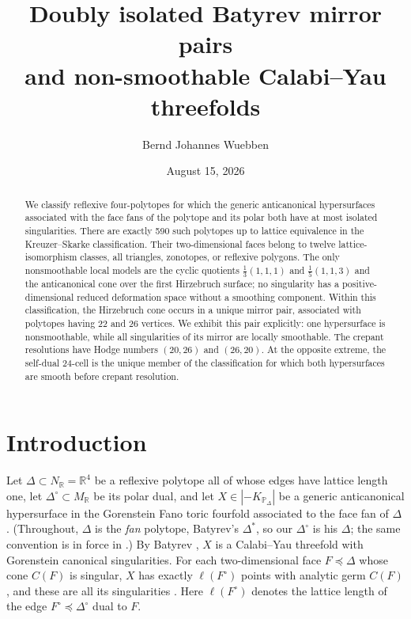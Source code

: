 \documentclass[11pt]{amsart}
\title[Doubly isolated Batyrev mirror pairs]{Doubly isolated Batyrev mirror
pairs\\ and non-smoothable Calabi--Yau threefolds}
\author{Bernd Johannes Wuebben}
\date{August 15, 2026}
\theoremstyle{definition}
\theoremstyle{remark}
\newcommand{\RR}{\mathbb{R}}
\newcommand{\PP}{\mathbb{P}}
\newcommand{\NN}{N}
\newcommand{\MM}{M}
\begin{document}
\begin{abstract}
We classify reflexive four-polytopes for which the generic
anticanonical hypersurfaces associated with the face fans of the polytope
and its polar both have at most isolated singularities. There are exactly
590 such polytopes up to lattice equivalence in the Kreuzer--Skarke
classification.
Their two-dimensional faces belong to twelve lattice-isomorphism
classes, all triangles, zonotopes, or reflexive polygons. The only
nonsmoothable local models are the cyclic quotients
$\frac13(1,1,1)$ and $\frac15(1,1,3)$ and the anticanonical cone over the
first Hirzebruch surface; no singularity has a positive-dimensional
reduced deformation space without a smoothing component. Within this
classification, the Hirzebruch cone occurs in a unique mirror pair,
associated with polytopes having 22 and 26 vertices. We exhibit this
pair explicitly: one hypersurface is nonsmoothable, while all
singularities of its mirror are locally smoothable. The crepant
resolutions have Hodge numbers $(20,26)$ and $(26,20)$. At the opposite
extreme, the self-dual 24-cell is the unique member of the classification
for which both hypersurfaces are smooth before crepant resolution.
\end{abstract}

\maketitle

\section{Introduction}\label{sec:intro}

Let $\Delta \subset \NN_\RR = \RR^4$ be a reflexive polytope all of whose edges
have lattice length one, let $\Delta^\circ \subset \MM_\RR$ be its polar dual,
and let $X \in |{-K_{\PP_\Delta}}|$ be a generic anticanonical hypersurface in
the Gorenstein Fano toric fourfold associated to the face fan of $\Delta$.
(Throughout, $\Delta$ is the \emph{fan} polytope, Batyrev's $\Delta^\ast$,
so our $\Delta^\circ$ is his $\Delta$; the same convention is in force in
\cite{paper1,paper2}.)  By
Batyrev \cite{Batyrev94}, $X$ is a Calabi--Yau threefold with Gorenstein
canonical singularities.  For each two-dimensional face
$F\preceq\Delta$ whose cone $C(F)$ is singular, $X$ has exactly
$\ell(F^\circ)$ points with analytic germ $C(F)$, and these are all its
singularities \cite[Prop.~3.1]{paper1}.  Here $\ell(F^\circ)$ denotes
the lattice length of the edge $F^\circ\preceq\Delta^\circ$ dual to $F$.
\end{document}

